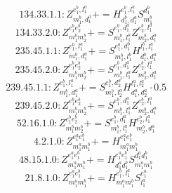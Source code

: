 \documentclass[letterpaper,10pt,fleqn,leqno,onecolumn]{article}
\begin{document}
\begin{equation} \;\;\;\;\;\;  134.33.1.1: Z^{e_{1}^{b},l_{1}^{a}}_{m_{1}^{b},d_{1}^{a}}+=H^{e_{1}^{b},l_{1}^{a}}_{d_{1}^{b},d_{1}^{a}}S^{d_{1}^{b}}_{m_{1}^{b}} \end{equation}
\begin{equation} \;\;\;\;\;\;  134.33.2.0: Z^{e_{1}^{b}e_{2}^{b}}_{m_{1}^{b}m_{2}^{b}}+=S^{e_{1}^{b},d_{1}^{a}}_{m_{1}^{b},l_{1}^{a}}Z^{e_{2}^{b},l_{1}^{a}}_{m_{2}^{b},d_{1}^{a}} \end{equation}
\begin{equation} \;\;\;\;\;\;  235.45.1.1: Z^{e_{1}^{b},l_{1}^{a}}_{m_{1}^{b},d_{1}^{a}}+=S^{e_{1}^{b},d_{1}^{b}}_{m_{1}^{b},l_{1}^{b}}H^{l_{1}^{b},l_{1}^{a}}_{d_{1}^{b},d_{1}^{a}} \end{equation}
\begin{equation} \;\;\;\;\;\;  235.45.2.0: Z^{e_{1}^{b}e_{2}^{b}}_{m_{1}^{b}m_{2}^{b}}+=S^{e_{1}^{b},d_{1}^{a}}_{m_{1}^{b},l_{1}^{a}}Z^{e_{2}^{b},l_{1}^{a}}_{m_{2}^{b},d_{1}^{a}} \end{equation}
\begin{equation} \;\;\;\;\;\;  239.45.1.1: Z^{e_{1}^{b},l_{1}^{a}}_{m_{1}^{b},d_{1}^{a}}+=S^{e_{1}^{b},d_{2}^{a}}_{m_{1}^{b},l_{2}^{a}}H^{l_{1}^{a},l_{2}^{a}}_{d_{1}^{a},d_{2}^{a}}\cdot 0.5 \end{equation}
\begin{equation} \;\;\;\;\;\;  239.45.2.0: Z^{e_{1}^{b}e_{2}^{b}}_{m_{1}^{b}m_{2}^{b}}+=S^{e_{1}^{b},d_{1}^{a}}_{m_{1}^{b},l_{1}^{a}}Z^{e_{2}^{b},l_{1}^{a}}_{m_{2}^{b},d_{1}^{a}} \end{equation}
\begin{equation} \;\;\;\;\;\;  52.16.1.0: Z^{e_{1}^{b}e_{2}^{b}}_{m_{1}^{b}m_{2}^{b}}+=S^{e_{1}^{b},d_{1}^{a}}_{m_{1}^{b},l_{1}^{a}}H^{e_{2}^{b},l_{1}^{a}}_{m_{2}^{b},d_{1}^{a}} \end{equation}
\begin{equation} \;\;\;\;\;\;  4.2.1.0: Z^{e_{1}^{a}e_{1}^{b}}_{m_{1}^{a}m_{1}^{b}}+=H^{e_{1}^{a}e_{1}^{b}}_{m_{1}^{a}m_{1}^{b}} \end{equation}
\begin{equation} \;\;\;\;\;\;  48.15.1.0: Z^{e_{1}^{a}e_{1}^{b}}_{m_{1}^{a}m_{1}^{b}}+=H^{e_{1}^{a}e_{1}^{b}}_{d_{1}^{a}d_{1}^{b}}S^{d_{1}^{a}d_{1}^{b}}_{m_{1}^{a}m_{1}^{b}} \end{equation}
\begin{equation} \;\;\;\;\;\;  21.8.1.0: Z^{e_{1}^{a}e_{1}^{b}}_{m_{1}^{a}m_{1}^{b}}+=H^{e_{1}^{b},l_{1}^{a}}_{m_{1}^{a}m_{1}^{b}}S^{e_{1}^{a}}_{l_{1}^{a}} \end{equation}
\end{document}

